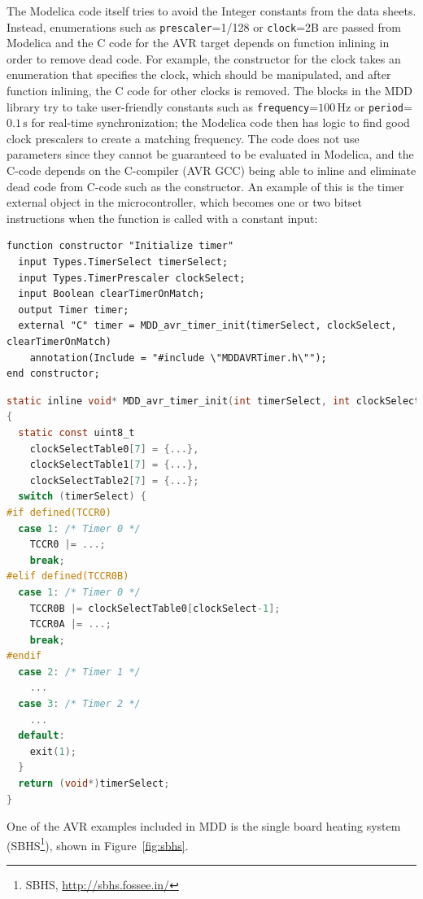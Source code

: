 \documentclass{resources/modelica}
\newcommand{\modelica}[1]{\lstinline[language=modelica]|#1|}
\begin{document}
The Modelica code itself tries to avoid the Integer constants from the
data sheets.
Instead, enumerations such as \modelica{prescaler}=1/128 or \modelica{clock}=2B are
passed from Modelica and the C code for the AVR target depends on
function inlining in order to remove dead code.
For example, the constructor for the clock takes an enumeration that
specifies the clock, which should be manipulated, and after function inlining, the
C code for other clocks is removed.
The blocks in the MDD library try to take user-friendly constants
such as \modelica{frequency}=$100\,\mathrm{Hz}$ or \modelica{period}=$0.1\,\mathrm{s}$ for real-time synchronization; the
Modelica code then has logic to find good clock prescalers to create a
matching frequency.
The code does not use parameters since they cannot be guaranteed to be
evaluated in Modelica, and the C-code depends on the C-compiler (AVR GCC)
being able to inline and eliminate dead code from C-code such as the constructor.
An example of this is the timer external object in the microcontroller, which becomes one or two bitset
instructions when the function is called with a constant input:
\begin{lstlisting}[language=Modelica]
function constructor "Initialize timer"
  input Types.TimerSelect timerSelect;
  input Types.TimerPrescaler clockSelect;
  input Boolean clearTimerOnMatch;
  output Timer timer;
  external "C" timer = MDD_avr_timer_init(timerSelect, clockSelect, clearTimerOnMatch)
    annotation(Include = "#include \"MDDAVRTimer.h\"");
end constructor;
\end{lstlisting}
\begin{lstlisting}[language=C]
static inline void* MDD_avr_timer_init(int timerSelect, int clockSelect, int clearTimerOnMatch)
{
  static const uint8_t
    clockSelectTable0[7] = {...},
    clockSelectTable1[7] = {...},
    clockSelectTable2[7] = {...};
  switch (timerSelect) {
#if defined(TCCR0)
  case 1: /* Timer 0 */
    TCCR0 |= ...;
    break;
#elif defined(TCCR0B)
  case 1: /* Timer 0 */
    TCCR0B |= clockSelectTable0[clockSelect-1];
    TCCR0A |= ...;
    break;
#endif
  case 2: /* Timer 1 */
    ...
  case 3: /* Timer 2 */
    ...
  default:
    exit(1);
  }
  return (void*)timerSelect;
}
\end{lstlisting}
One of the AVR examples included in MDD is the single board heating system (SBHS\footnote{SBHS, \url{http://sbhs.fossee.in/}}), shown in Figure~\ref{fig:sbhs}.
\end{document}
